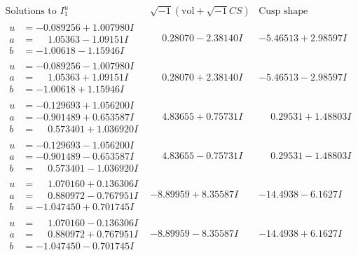 \documentclass[1p]{elsarticle_modified}
\theoremstyle{definition}
\newcommand{\I}{\sqrt{-1}}
\begin{document}
$$\begin{array}{c|c|c}  
\text{Solutions to }I^u_{1}& \I (\text{vol} + \sqrt{-1}CS) & \text{Cusp shape}\\
 \hline 
\begin{aligned}
u &= -0.089256 + 1.007980 I \\
a &= \phantom{-}1.05363 - 1.09151 I \\
b &= -1.00618 - 1.15946 I\end{aligned}
 & \phantom{-}0.28070 - 2.38140 I & -5.46513 + 2.98597 I \\ \hline\begin{aligned}
u &= -0.089256 - 1.007980 I \\
a &= \phantom{-}1.05363 + 1.09151 I \\
b &= -1.00618 + 1.15946 I\end{aligned}
 & \phantom{-}0.28070 + 2.38140 I & -5.46513 - 2.98597 I \\ \hline\begin{aligned}
u &= -0.129693 + 1.056200 I \\
a &= -0.901489 + 0.653587 I \\
b &= \phantom{-}0.573401 + 1.036920 I\end{aligned}
 & \phantom{-}4.83655 + 0.75731 I & \phantom{-}0.29531 + 1.48803 I \\ \hline\begin{aligned}
u &= -0.129693 - 1.056200 I \\
a &= -0.901489 - 0.653587 I \\
b &= \phantom{-}0.573401 - 1.036920 I\end{aligned}
 & \phantom{-}4.83655 - 0.75731 I & \phantom{-}0.29531 - 1.48803 I \\ \hline\begin{aligned}
u &= \phantom{-}1.070160 + 0.136306 I \\
a &= \phantom{-}0.880972 - 0.767951 I \\
b &= -1.047450 + 0.701745 I\end{aligned}
 & -8.89959 + 8.35587 I & -14.4938 - 6.1627 I \\ \hline\begin{aligned}
u &= \phantom{-}1.070160 - 0.136306 I \\
a &= \phantom{-}0.880972 + 0.767951 I \\
b &= -1.047450 - 0.701745 I\end{aligned}
 & -8.89959 - 8.35587 I & -14.4938 + 6.1627 I \\ \hline\begin{aligned}

\end{aligned}
\end{array}$$
\end{document}
